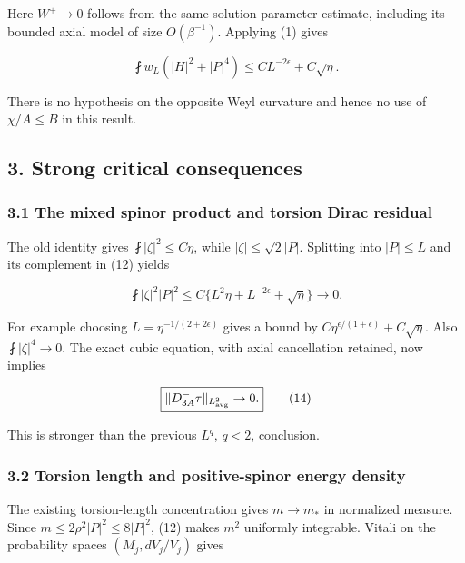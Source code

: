 \documentclass[11pt]{article}
\begin{document}
Here \(W^+\to0\) follows from the same-solution parameter estimate,
including its bounded axial model of size \(O(\beta^{-1})\). Applying
(1) gives

\[
 \boxed{\fint w_L(|H|^2+|P|^4)
         \le C L^{-2\epsilon}+C\sqrt\eta.}\tag{12}
\]

There is no hypothesis on the opposite Weyl curvature and hence no use
of \(\chi/A\le B\) in this result.

\hypertarget{strong-critical-consequences}{%
\subsection{3. Strong critical
consequences}\label{strong-critical-consequences}}

\hypertarget{the-mixed-spinor-product-and-torsion-dirac-residual}{%
\subsubsection{3.1 The mixed spinor product and torsion Dirac
residual}\label{the-mixed-spinor-product-and-torsion-dirac-residual}}

The old identity gives \(\fint|\zeta|^2\le C\eta\), while
\(|\zeta|\le\sqrt2|P|\). Splitting into \(|P|\le L\) and its complement
in (12) yields

\[
 \fint|\zeta|^2|P|^2
 \le C\{L^2\eta+L^{-2\epsilon}+\sqrt\eta\}\to0.
\tag{13}
\]

For example choosing \(L=\eta^{-1/(2+2\epsilon)}\) gives a bound by
\(C\eta^{\epsilon/(1+\epsilon)}+C\sqrt\eta\). Also
\(\fint|\zeta|^4\to0\). The exact cubic equation, with axial
cancellation retained, now implies

\[
 \boxed{\|D^-_{3A}\tau\|_{L^2_{\rm avg}}\to0.}\tag{14}
\]

This is stronger than the previous \(L^q\), \(q<2\), conclusion.

\hypertarget{torsion-length-and-positive-spinor-energy-density}{%
\subsubsection{3.2 Torsion length and positive-spinor energy
density}\label{torsion-length-and-positive-spinor-energy-density}}

The existing torsion-length concentration gives \(m\to m_*\) in
normalized measure. Since \(m\le2\rho^2|P|^2\le8|P|^2\), (12) makes
\(m^2\) uniformly integrable. Vitali on the probability spaces
\((M_j,dV_j/V_j)\) gives
\end{document}
